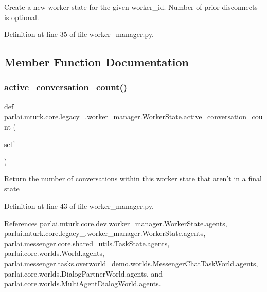 \begin{DoxyVerb}Create a new worker state for the given worker_id. Number of
prior disconnects is optional.
\end{DoxyVerb}
 

Definition at line 35 of file worker\+\_\+manager.\+py.



\subsection{Member Function Documentation}
\mbox{\label{classparlai_1_1mturk_1_1core_1_1legacy__2018_1_1worker__manager_1_1WorkerState_a0f22df8925f5461e6a55ddd6b2cc22b3}} 
\subsubsection{\texorpdfstring{active\+\_\+conversation\+\_\+count()}{active\_conversation\_count()}}
{\footnotesize\ttfamily def parlai.\+mturk.\+core.\+legacy\+\_.\+worker\+\_\+manager.\+Worker\+State.\+active\+\_\+conversation\+\_\+count (\begin{DoxyParamCaption}\item[{}]{self }\end{DoxyParamCaption})}

\begin{DoxyVerb}Return the number of conversations within this worker state
that aren't in a final state
\end{DoxyVerb}
 

Definition at line 43 of file worker\+\_\+manager.\+py.



References parlai.\+mturk.\+core.\+dev.\+worker\+\_\+manager.\+Worker\+State.\+agents, parlai.\+mturk.\+core.\+legacy\+\_.\+worker\+\_\+manager.\+Worker\+State.\+agents, parlai.\+messenger.\+core.\+shared\+\_\+utils.\+Task\+State.\+agents, parlai.\+core.\+worlds.\+World.\+agents, parlai.\+messenger.\+tasks.\+overworld\+\_\+demo.\+worlds.\+Messenger\+Chat\+Task\+World.\+agents, parlai.\+core.\+worlds.\+Dialog\+Partner\+World.\+agents, and parlai.\+core.\+worlds.\+Multi\+Agent\+Dialog\+World.\+agents.

